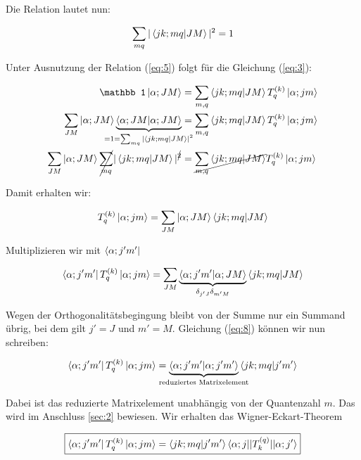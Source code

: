 Die Relation lautet nun:

\begin{equation}
  \label{eq:5}
  \sum_{mq}|\braket{jk;mq}{JM} |^2 = 1
\end{equation}

Unter Ausnutzung der Relation (\ref{eq:5}) folgt für die Gleichung (\ref{eq:3}):

\begin{align*}
  \label{eq:6}
   \mathbb 1 \ket{\alpha; JM} &=  \sum_{m,q} \braket{jk;mq}{JM} T^{(k)}_q  \ket{\alpha;jm} \\
 \sum_{JM} \ket{\alpha; JM}\underbr{\braket{\alpha; JM}{\alpha; JM}}_{=1=\sum_{mq}|\braket{jk;mq}{JM} |^2} &=  \sum_{m,q} \braket{jk;mq}{JM} T^{(k)}_q  \ket{\alpha;jm} \\
\sum_{JM}\ket{\alpha; JM} \cancel{\sum_{mq}}|\braket{jk;mq}{JM} |^{\cancel 2}   &= \cancel{\sum_{m,q} \braket{jk;mq}{JM}} T^{(k)}_q  \ket{\alpha;jm} 
\end{align*}

Damit erhalten wir:

\begin{equation}
  \label{eq:7}
   T^{(k)}_q  \ket{\alpha;jm} = \sum_{JM}\ket{\alpha; JM} \braket{jk;mq}{JM}
\end{equation}

Multiplizieren wir mit \(\left\langle \alpha;j'm' \right|\)

\begin{equation}
  \label{eq:8}
  \bra{\alpha;j'm'} T^{(k)}_q  \ket{\alpha;jm} = \sum_{JM} \underbr{\braket{\alpha;j'm'}{\alpha; JM}}_{\delta_{j'J}\delta_{m'M}} \braket{jk;mq}{JM}
\end{equation}

Wegen der Orthogonalitätsbegingung bleibt von der Summe nur ein Summand übrig, bei dem gilt \(j'=J\) und \(m'=M\). Gleichung (\ref{eq:8}) können wir nun schreiben:

\begin{equation}
  \label{eq:9}
   \bra{\alpha;j'm'} T^{(k)}_q  \ket{\alpha;jm} = \underbr{\braket{\alpha;j'm'}{\alpha; j'm'}}_{\text{reduziertes Matrixelement}}  \braket{jk;mq}{j'm'}
\end{equation}

Dabei ist das reduzierte Matrixelement unabhängig von der Quantenzahl \(m\). Das wird im Anschluss \ref{sec:2} bewiesen. Wir erhalten das Wigner-Eckart-Theorem

\begin{equation}
  \label{eq:15}
\boxed{\bra{\alpha;j'm'} T^{(k)}_q  \ket{\alpha;jm} =  \braket{jk;mq}{j'm'} \langle \alpha;j || T^{(q)}_k || \alpha; j' \rangle }
\end{equation}


